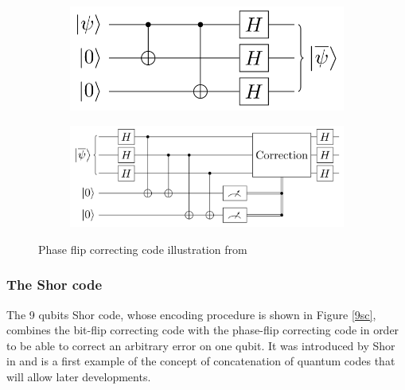 \documentclass{article}
\begin{document}
\begin{figure}[H]
	\begin{subfigure}{0.5\textwidth}
		\includegraphics[scale = 0.20]{phase-flip-encode.png}
	\end{subfigure}
	\hspace{-50pt}
	\begin{subfigure}{0.5\textwidth}
		\includegraphics[scale = 0.18]{phase-flip-detect.png}
	\end{subfigure}
	\caption{Phase flip correcting code illustration from \cite{prefetch_repetition_code}}\label{pfc}
\end{figure}


\subsubsection{The Shor code}
The 9 qubits Shor code, whose encoding procedure is shown in Figure \ref{9sc},
combines the bit-flip correcting code with the phase-flip correcting code in order
to be able to correct an arbitrary error on one qubit.
It was introduced by Shor in \cite{shor1995scheme} and is a first example of the concept of concatenation of
quantum codes that will allow later developments.
\end{document}

